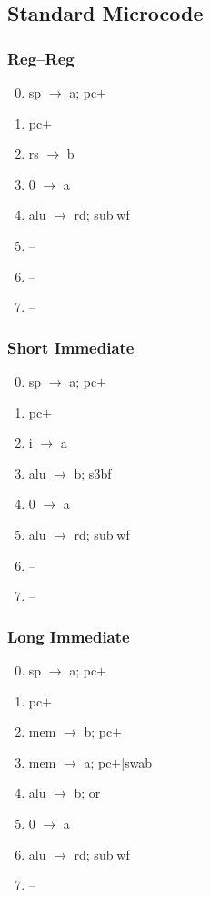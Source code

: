 \documentclass[11pt]{book}
\begin{document}
\subsection*{Standard Microcode}
\begin{multicols}{3}\ttfamily\selectfont\small
  \subsubsection*{Reg--Reg}
  \begin{enumerate}\setcounter{enumi}{-1}
  \item sp \(\rightarrow\) a; pc\(+\)
  \item pc\(+\)
  \item rs \(\rightarrow\) b
  \item 0 \(\rightarrow\) a
  \item alu \(\rightarrow\) rd; sub|wf
  \item --
  \item --
  \item --
  \end{enumerate}
  \columnbreak
  \subsubsection*{Short Immediate}
  \begin{enumerate}\setcounter{enumi}{-1}
  \item sp \(\rightarrow\) a; pc\(+\)
  \item pc\(+\)
  \item i \(\rightarrow\) a
  \item alu \(\rightarrow\) b; s3bf
  \item 0 \(\rightarrow\) a
  \item alu \(\rightarrow\) rd; sub|wf
  \item --
  \item --
  \end{enumerate}
  \columnbreak
  \subsubsection*{Long Immediate}
  \begin{enumerate}\setcounter{enumi}{-1}
  \item sp \(\rightarrow\) a; pc\(+\)
  \item pc\(+\)
  \item mem \(\rightarrow\) b; pc\(+\)
  \item mem \(\rightarrow\) a; pc\(+\)|swab
  \item alu \(\rightarrow\) b; or
  \item 0 \(\rightarrow\) a
  \item alu \(\rightarrow\) rd; sub|wf
  \item --
  \end{enumerate}
\end{multicols}
\end{document}
